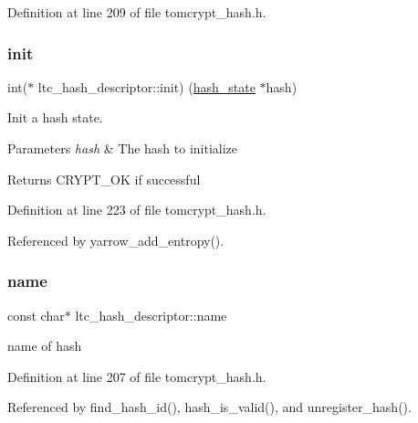 Definition at line 209 of file tomcrypt\+\_\+hash.\+h.

\mbox{\label{structltc__hash__descriptor_a941404c4d446f4aa5ad0900a1b1c6838}} 
\subsubsection{\texorpdfstring{init}{init}}
{\footnotesize\ttfamily int($\ast$ ltc\+\_\+hash\+\_\+descriptor\+::init) (\mbox{\hyperlink{tomcrypt__hash_8h_af5d2e619794bf148fceb9332d3fcece6}{hash\+\_\+state}} $\ast$hash)}



Init a hash state. 


\begin{DoxyParams}{Parameters}
{\em hash} & The hash to initialize \\
\hline
\end{DoxyParams}
\begin{DoxyReturn}{Returns}
C\+R\+Y\+P\+T\+\_\+\+OK if successful 
\end{DoxyReturn}


Definition at line 223 of file tomcrypt\+\_\+hash.\+h.



Referenced by yarrow\+\_\+add\+\_\+entropy().

\mbox{\label{structltc__hash__descriptor_a34074c695cfb4df7f2a899cf518b4bab}} 
\subsubsection{\texorpdfstring{name}{name}}
{\footnotesize\ttfamily const char$\ast$ ltc\+\_\+hash\+\_\+descriptor\+::name}



name of hash 



Definition at line 207 of file tomcrypt\+\_\+hash.\+h.



Referenced by find\+\_\+hash\+\_\+id(), hash\+\_\+is\+\_\+valid(), and unregister\+\_\+hash().

\mbox{\label{structltc__hash__descriptor_a9ac18099398a5f78a7380eb9b8d435d2}} 
